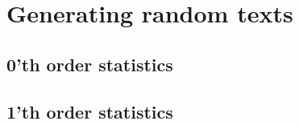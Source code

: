 \section{Generating random texts}
\subsection{0'th order statistics}

\subsection{1'th order statistics}

